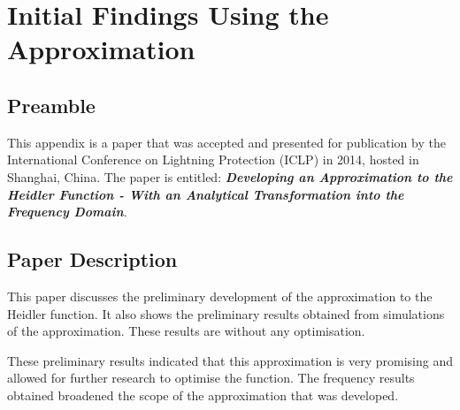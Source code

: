 
\chapter{Initial Findings Using the Approximation} %

\label{AppendixDef} %



\section{Preamble}
\label{sec:def_preamble}
This appendix is a paper that was accepted and presented for publication by the International Conference on Lightning Protection (ICLP) in 2014, hosted in Shanghai, China. The paper is entitled: \textbf{\textit{Developing an Approximation to the Heidler Function - With an Analytical Transformation into the Frequency Domain}}.


\section{Paper Description}
\label{sec:def_paper_description}
This paper discusses the preliminary development of the approximation to the Heidler function. It also shows the preliminary results obtained from simulations of the approximation. These results are without any optimisation.

These preliminary results indicated that this approximation is very promising and allowed for further research to optimise the function. The frequency results obtained broadened the scope of the approximation that was developed.

\makeatletter

\makeatother
